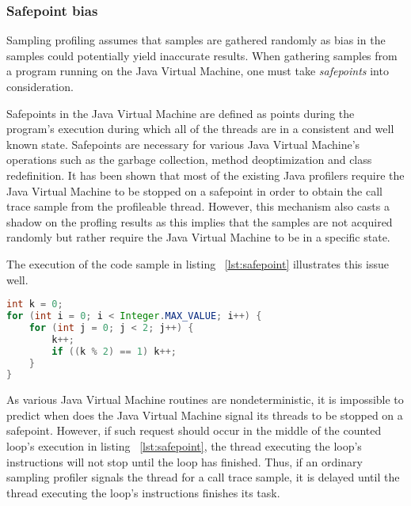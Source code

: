 \documentclass[..thesis.tex]{subfiles}
\begin{document}

\subsubsection{Safepoint bias}

Sampling profiling assumes that samples are gathered randomly as bias in the samples could potentially yield inaccurate results. When gathering samples from a program running on the Java Virtual Machine, one must take \textit{safepoints} into consideration. 

Safepoints in the Java Virtual Machine are defined as points during the program's execution during which all of the threads are in a consistent and well known state. Safepoints are necessary for various Java Virtual Machine's operations such as the garbage collection, method deoptimization and class redefinition.\cite{hotspot_glossary} It has been shown that most of the existing Java profilers require the Java Virtual Machine to be stopped on a safepoint in order to obtain the call trace sample from the profileable thread.\cite{wakart_psychosomatic_2016} However, this mechanism also casts a shadow on the profling results as this implies that the samples are not acquired randomly but rather require the Java Virtual Machine to be in a specific state. \cite{mytkowicz_evaluating_2010}

The execution of the code sample in listing ~\ref{lst:safepoint} illustrates this issue well. 
\begin{lstlisting}[language=java,style=def,label={lst:safepoint}, caption={Counted loops do not contain safepoints}]
int k = 0;
for (int i = 0; i < Integer.MAX_VALUE; i++) {
	for (int j = 0; j < 2; j++) {
    	k++;
    	if ((k % 2) == 1) k++;
	}
}
\end{lstlisting}
As various Java Virtual Machine routines are nondeterministic, it is impossible to predict when does the Java Virtual Machine signal its threads to be stopped on a safepoint. However, if such request should occur in the middle of the counted loop's execution in listing ~\ref{lst:safepoint}, the thread executing the loop's instructions will not stop until the loop has finished. Thus, if an ordinary sampling profiler signals the thread for a call trace sample, it is delayed until the thread executing the loop's instructions finishes its task. \cite{wakart_psychosomatic_2015}
\end{document}

